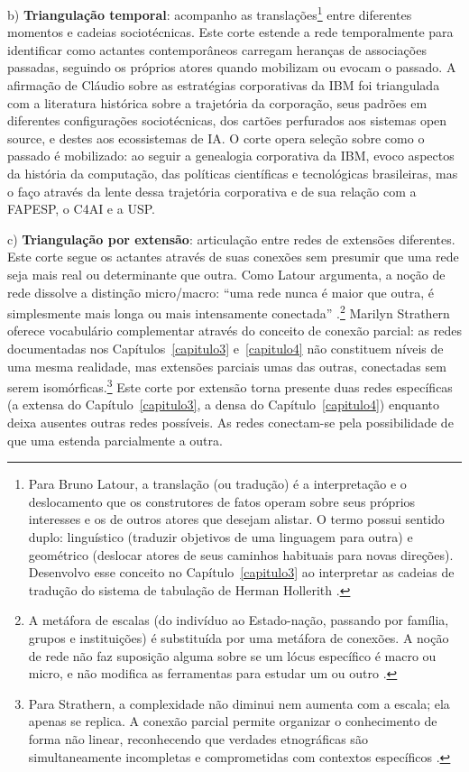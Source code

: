 b) \textbf{Triangulação temporal}: acompanho as translações\footnote{Para Bruno Latour, a translação (ou tradução) é a interpretação e o deslocamento que os construtores de fatos operam sobre seus próprios interesses e os de outros atores que desejam alistar. O termo possui sentido duplo: linguístico (traduzir objetivos de uma linguagem para outra) e geométrico (deslocar atores de seus caminhos habituais para novas direções). Desenvolvo esse conceito no Capítulo~\ref{capitulo3} ao interpretar as cadeias de tradução do sistema de tabulação de Herman Hollerith \parencite[pp. 159-225]{Latour2011CienciaEmAcao}.} entre diferentes momentos e cadeias sociotécnicas. Este corte estende a rede temporalmente para identificar como actantes contemporâneos carregam heranças de associações passadas, seguindo os próprios atores quando mobilizam ou evocam o passado. A afirmação de Cláudio sobre as estratégias corporativas da IBM foi triangulada com a literatura histórica sobre a trajetória da corporação, seus padrões em diferentes configurações sociotécnicas, dos cartões perfurados aos sistemas open source, e destes aos ecossistemas de IA. O corte opera seleção sobre como o passado é mobilizado: ao seguir a genealogia corporativa da IBM, evoco aspectos da história da computação, das políticas científicas e tecnológicas brasileiras, mas o faço através da lente dessa trajetória corporativa e de sua relação com a FAPESP, o C4AI e a USP.

c) \textbf{Triangulação por extensão}: articulação entre redes de extensões diferentes. Este corte segue os actantes através de suas conexões sem presumir que uma rede seja mais real ou determinante que outra. Como Latour argumenta, a noção de rede dissolve a distinção micro/macro: ``uma rede nunca é maior que outra, é simplesmente mais longa ou mais intensamente conectada'' \parencite[p. 370]{Latour_SozialeWelt_1996}.\footnote{A metáfora de escalas (do indivíduo ao Estado-nação, passando por família, grupos e instituições) é substituída por uma metáfora de conexões. A noção de rede não faz suposição alguma sobre se um lócus específico é macro ou micro, e não modifica as ferramentas para estudar um ou outro \parencite[pp. 369-371]{Latour_SozialeWelt_1996}.} Marilyn Strathern oferece vocabulário complementar através do conceito de conexão parcial: as redes documentadas nos Capítulos~\ref{capitulo3} e~\ref{capitulo4} não constituem níveis de uma mesma realidade, mas extensões parciais umas das outras, conectadas sem serem isomórficas.\footnote{Para Strathern, a complexidade não diminui nem aumenta com a escala; ela apenas se replica. A conexão parcial permite organizar o conhecimento de forma não linear, reconhecendo que verdades etnográficas são simultaneamente incompletas e comprometidas com contextos específicos \parencite{strathern2005partial}.} Este corte por extensão torna presente duas redes específicas (a extensa do Capítulo~\ref{capitulo3}, a densa do Capítulo~\ref{capitulo4}) enquanto deixa ausentes outras redes possíveis. As redes conectam-se pela possibilidade de que uma estenda parcialmente a outra.

